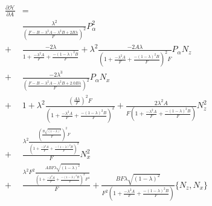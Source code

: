 \documentclass{article}
\begin{document}
\begin{align*}
	\frac{\partial \mathscr{H}}{\partial A} &= \\
	& \frac{\lambda^{2}}{\left( \frac{F - B - \lambda^{2} A - \lambda^{2} B + 2B \lambda}{F} \right)^{2}} P_{\alpha}^{2} \\
	+& \frac{ - 2 \lambda}{1 + \frac{ - \lambda^{2} A}{F} + \frac{ - \left( 1 - \lambda \right)^{2} B}{F} } + \lambda^{2} \frac{ - 2 A \lambda}{\left( 1 + \frac{ - \lambda^{2} A}{F} + \frac{ - \left( 1 - \lambda \right)^{2} B}{F} \right)^{2} F}
	 P_{\alpha}N_{z} \\
	+& \frac{ - 2 \lambda^{3}}{\left( \frac{F - B - \lambda^{2} A - \lambda^{2} B + 2.0 B \lambda}{F} \right)^{2}} P_{\alpha}N_{x} \\
	+& 1 + \lambda^{2} \frac{\left( \frac{A \lambda}{F} \right)^{2} F}{\left( 1 + \frac{ - \lambda^{2} A}{F} + \frac{ - \left( 1 - \lambda \right)^{2} B}{F} \right)^{2}} + \frac{2 \lambda^{2} A}{F \left( 1 + \frac{ - \lambda^{2} A}{F} + \frac{ - \left( 1 - \lambda \right)^{2} B}{F} \right)} N_{z}^{2} \\
	+& \frac{\lambda^{2} \frac{\left( \frac{B \sqrt{\left( 1 - \lambda \right)^{2}}}{F} \right)^{2} F}{\left( 1 + \frac{ - \lambda^{2} A}{F} + \frac{ - \left( 1 - \lambda \right)^{2} B}{F} \right)^{2}}}{F} N_{x}^{2} \\
	+& \frac{\lambda^{2} F^{2} \frac{A B F \lambda \sqrt{\left( 1 - \lambda \right)^{2}}}{\left( 1 + \frac{ - \lambda^{2} A}{F} + \frac{ - \left( 1 - \lambda \right)^{2} B}{F} \right)^{2} F^{4}}}{F} + \frac{B F \lambda \sqrt{\left( 1 - \lambda \right)^{2}}}{F^{2} \left( 1 + \frac{ - \lambda^{2} A}{F} + \frac{ - \left( 1 - \lambda \right)^{2} B}{F} \right)} \{N_{z},N_{x}\}
\end{align*}
\end{document}
